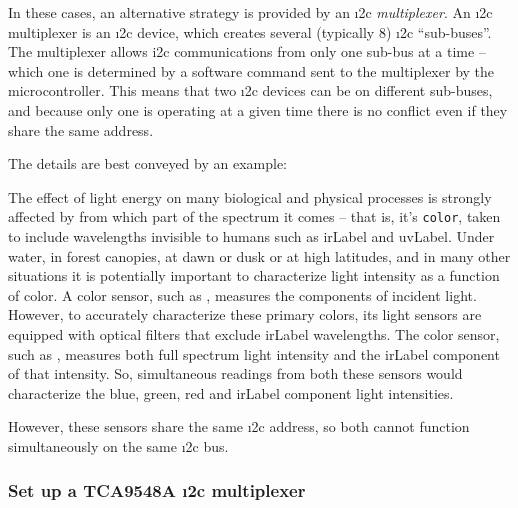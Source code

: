 In these cases, an alternative strategy is provided by an \i2c \emph{multiplexer}.
An \i2c multiplexer is an \i2c device, which creates several (typically 8) \i2c ``sub-buses''.
The multiplexer allows i2c communications from only one sub-bus at a time -- which one is determined by a software command sent to the multiplexer by the microcontroller.
This means that two \i2c devices can be on different sub-buses, and because only one is operating at a given time there is no conflict even if they share the same address.

The details are best conveyed by an example:

The effect of light energy on many biological and physical processes is strongly affected by from which part of the spectrum it comes -- that is, it's \texttt{color}, taken to include wavelengths invisible to humans such as \gls{irLabel} and \gls{uvLabel}.
Under water, in forest canopies, at dawn or dusk or at high latitudes, and in many other situations it is potentially important to characterize light intensity as a function of color.
A  color sensor, such as , measures the  components of incident light.
However, to accurately characterize these primary colors, its light sensors are equipped with optical filters that exclude \gls{irLabel} wavelengths.
The  color sensor, such as , measures both full spectrum light intensity and the \gls{irLabel} component of that intensity.
So, simultaneous readings from both these sensors would characterize the blue, green, red and \gls{irLabel} component light intensities.

However, these sensors share the same \i2c address, so both cannot function simultaneously on the same \i2c bus.

\subsubsection{\howto Set up a TCA9548A \i2c multiplexer}

